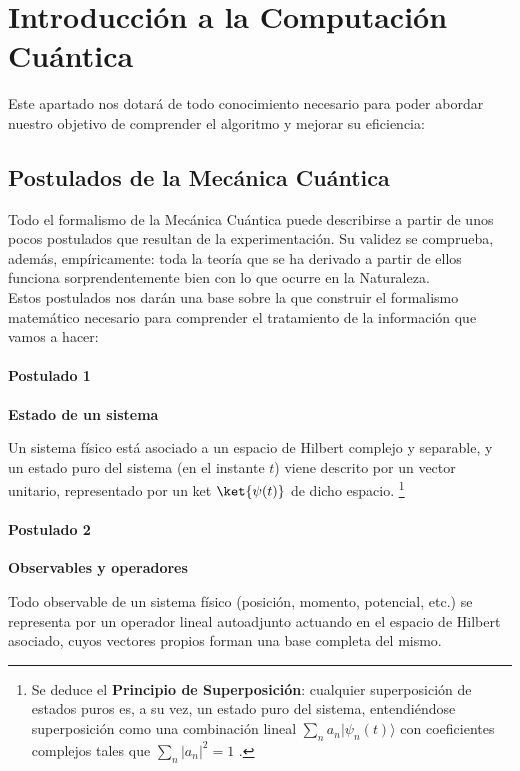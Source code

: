 \documentclass[11pt,a4paper,twoside,pdf]{article}
\numberwithin{equation}{section}
\begin{document}
\newpage
	
\section{Introducción a la Computación Cuántica}
	  
Este apartado nos dotará de todo conocimiento necesario para poder abordar nuestro objetivo de comprender el algoritmo \cite{Aaronson} y mejorar su eficiencia:
	  
	\subsection{Postulados de la Mecánica Cuántica }
	
	Todo el formalismo de la Mecánica Cuántica puede describirse a partir de unos pocos postulados que resultan de la experimentación. Su validez se comprueba, además, empíricamente: toda la teoría que se ha derivado a partir de ellos funciona sorprendentemente bien con lo que ocurre en la Naturaleza. 
			\\
	Estos postulados \cite{Zettili} nos darán una base sobre la que construir el formalismo matemático necesario para comprender el tratamiento  de la información que vamos a hacer:
	
			
		\paragraph{Postulado 1}\label{Par: Postulado 1} \textbf{Estado de un sistema}
			
			Un sistema físico está asociado a un espacio de Hilbert complejo y separable, y un estado puro del sistema (en el instante $t$) viene descrito por un vector unitario, representado por un ket $\ket{\psi(t)} $ de dicho espacio. \footnote{ Se deduce el \textbf{Principio de Superposición}: cualquier superposición de estados puros es, a su vez, un estado puro del sistema, entendiéndose superposición como una combinación lineal $\sum_n  a_n |\psi_n(t)  \rangle $ con coeficientes complejos tales que $\sum_n |a_n|^2=1 $ .}
			  
		\paragraph{Postulado 2}\label{Par: Postulado 2} \textbf{Observables y operadores}
			
			Todo observable de un sistema físico (posición, momento, potencial, etc.) se representa por un operador lineal autoadjunto actuando en el espacio de Hilbert asociado, cuyos vectores propios forman una base completa del mismo. 	
			  
\end{document}
